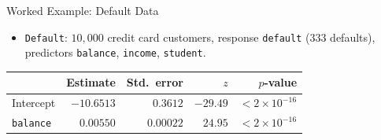 

\begin{frame}{Worked Example: Default Data}
    \begin{itemize}
        \item \texttt{Default}: $10{,}000$ credit card customers, response \texttt{default} ($333$ defaults), predictors \texttt{balance}, \texttt{income}, \texttt{student}.
    \end{itemize}
    \begin{center}
        {\small
        \renewcommand{\arraystretch}{1.15}
        \begin{tabular}{lrrrr}
        \toprule
        & Estimate & Std.\ error & $z$ & $p$-value \\
        \midrule
        Intercept & $-10.6513$ & $0.3612$ & $-29.49$ & $< 2 \times 10^{-16}$ \\
        \texttt{balance} & $0.00550$ & $0.00022$ & $24.95$ & $< 2 \times 10^{-16}$ \\
        \bottomrule
        \end{tabular}
        }
    \end{center}
\end{frame}


